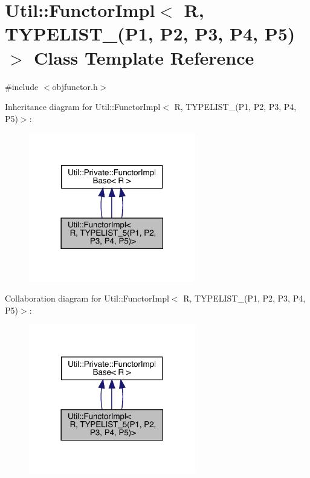 \hypertarget{classUtil_1_1FunctorImpl_3_01R_00_01TYPELIST__5_07P1_00_01P2_00_01P3_00_01P4_00_01P5_08_4}{}\section{Util\+:\+:Functor\+Impl$<$ R, T\+Y\+P\+E\+L\+I\+S\+T\+\_(P1, P2, P3, P4, P5)$>$ Class Template Reference}
\label{classUtil_1_1FunctorImpl_3_01R_00_01TYPELIST__5_07P1_00_01P2_00_01P3_00_01P4_00_01P5_08_4}


{\ttfamily \#include $<$objfunctor.\+h$>$}



Inheritance diagram for Util\+:\+:Functor\+Impl$<$ R, T\+Y\+P\+E\+L\+I\+S\+T\+\_(P1, P2, P3, P4, P5)$>$\+:
\nopagebreak
\begin{figure}[H]
\begin{center}
\leavevmode
\includegraphics[width=206pt]{da/dda/classUtil_1_1FunctorImpl_3_01R_00_01TYPELIST__5_07P1_00_01P2_00_01P3_00_01P4_00_01P5_08_4__inherit__graph}
\end{center}
\end{figure}


Collaboration diagram for Util\+:\+:Functor\+Impl$<$ R, T\+Y\+P\+E\+L\+I\+S\+T\+\_(P1, P2, P3, P4, P5)$>$\+:
\nopagebreak
\begin{figure}[H]
\begin{center}
\leavevmode
\includegraphics[width=206pt]{d4/dbf/classUtil_1_1FunctorImpl_3_01R_00_01TYPELIST__5_07P1_00_01P2_00_01P3_00_01P4_00_01P5_08_4__coll__graph}
\end{center}
\end{figure}
